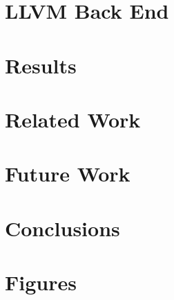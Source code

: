 \documentclass[a4paper]{report}
\begin{document}
	\chapter{LLVM Back End} \label{chap:llvm}
	
	
	\chapter{Results} \label{chap:results}
	
	
	\chapter{Related Work} \label{chap:related-work}
	
	
	\chapter{Future Work} \label{chap:future-work}
	
	
	\chapter{Conclusions} \label{chap:conclusions}
	
	
	\appendix
	\chapter{Figures}
	
		
	

	
\end{document}
